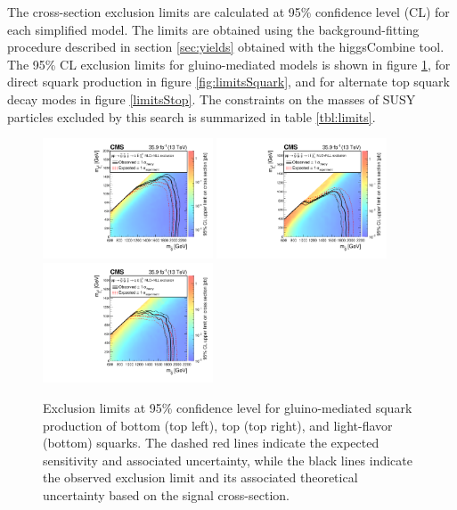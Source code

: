 The cross-section exclusion limits are calculated at 95\% confidence level (CL) for each simplified model. The limits are obtained using the background-fitting procedure described in section \ref{sec:yields} obtained with the higgsCombine tool. The 95\% CL exclusion limits for gluino-mediated models is shown in figure \ref{fig:limitsGluino}, for direct squark production in figure \ref{fig:limitsSquark}, and for alternate top squark decay modes in figure \ref{limitsStop}. The constraints on the masses of SUSY particles excluded by this search is summarized in table \ref{tbl:limits}.
\begin{figure}
	\centering
	\includegraphics[width=0.45\textwidth]{results/figs/interpretations/T1bbbb_35p9ifb_Moriond2017_Mar07_XSEC}
	\includegraphics[width=0.45\textwidth]{results/figs/interpretations/T1tttt_35p9ifb_Moriond2017_Mar07_XSEC}
	\includegraphics[width=0.45\textwidth]{results/figs/interpretations/T1qqqq_35p9ifb_Moriond2017_Mar07_XSEC}
	\caption{Exclusion limits at 95\% confidence level for gluino-mediated squark production of bottom (top left), top (top right), and light-flavor (bottom) squarks. The dashed red lines indicate the expected sensitivity and associated uncertainty, while the black lines indicate the observed exclusion limit and its associated theoretical uncertainty based on the signal cross-section.}
	\label{fig:limitsGluino}
\end{figure}
